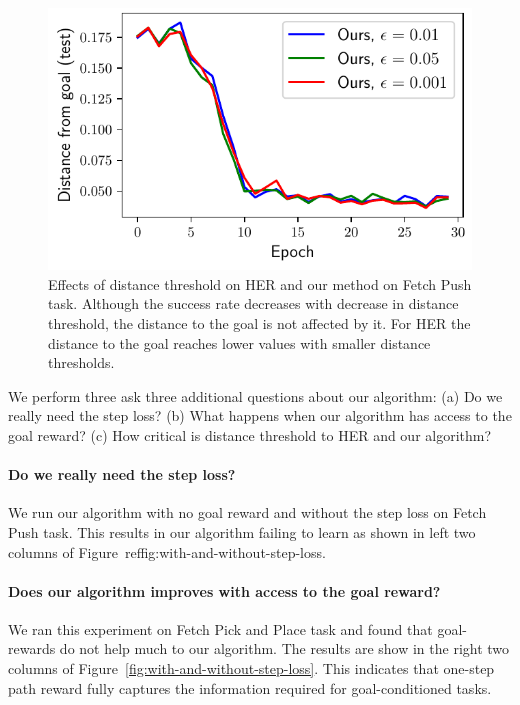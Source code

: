 \begin{figure}
  \includegraphics[width=\frac\columnwidth]{media/res/ablate-ddpg-dqst-low_tresh_chosen-low_thresh_alt-dqst/0.001-FetchPushPR-be467dfepoch-test/ag_g_dist.pdf}%
  \caption{Effects of distance threshold on HER and our method on Fetch Push
task. Although the success rate decreases with decrease in distance threshold,
the distance to the goal is not affected by it. For HER the distance to the goal
reaches lower values with smaller distance thresholds.}%
  \label{fig:with-different-distance-thresholds}%
\end{figure}%
% 

We perform three ask three additional questions about our algorithm:
(a) Do we really need the step loss?
(b) What happens when our algorithm has access to the goal reward?
(c) How critical is distance threshold to HER and our algorithm?
\paragraph{Do we really need the step loss?}
%
We run our algorithm with no goal reward and without the step loss on Fetch Push
task. This results in our algorithm failing to learn as shown in left two
columns of Figure~ref{fig:with-and-without-step-loss}.

\paragraph{Does our algorithm improves with access to the goal reward?}

We ran this experiment on Fetch Pick and Place task and found that goal-rewards
do not help much to our algorithm. The results are show in the right two columns
of Figure~\ref{fig:with-and-without-step-loss}. This indicates that one-step path reward
fully captures the information required for goal-conditioned tasks.

